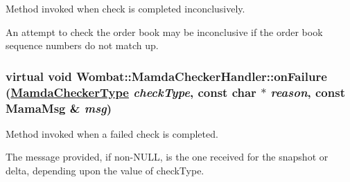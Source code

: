 Method invoked when check is completed inconclusively. 

An attempt to check the order book may be inconclusive if the order book sequence numbers do not match up. \hypertarget{classWombat_1_1MamdaCheckerHandler_42e88268913899c069f2b91dd8ad7399}{
\subsubsection[onFailure]{\setlength{\rightskip}{0pt plus 5cm}virtual void Wombat::Mamda\-Checker\-Handler::on\-Failure (\hyperlink{namespaceWombat_f4416a38ea95baf743f07d19ac9b6a4a}{Mamda\-Checker\-Type} {\em check\-Type}, const char $\ast$ {\em reason}, const Mama\-Msg \& {\em msg})}}
\label{classWombat_1_1MamdaCheckerHandler_42e88268913899c069f2b91dd8ad7399}


Method invoked when a failed check is completed. 

The message provided, if non-NULL, is the one received for the snapshot or delta, depending upon the value of check\-Type. 